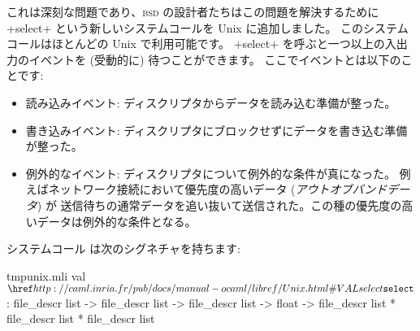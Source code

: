 これは深刻な問題であり、\textsc{bsd} の設計者たちはこの問題を解決するために
\ml+select+ という新しいシステムコールを Unix に追加しました。
このシステムコールはほとんどの Unix で利用可能です。
\ml+select+ を呼ぶと一つ以上の入出力のイベントを (受動的に) 待つことができます。
ここでイベントとは以下のことです:
%
\begin{itemize}
\item 読み込みイベント: ディスクリプタからデータを読み込む準備が整った。

\item 書き込みイベント: ディスクリプタにブロックせずにデータを書き込む準備が整った。

\item 例外的なイベント: ディスクリプタについて例外的な条件が真になった。
  例えばネットワーク接続において優先度の高いデータ (\emph{アウトオブバンドデータ}) が
  送信待ちの通常データを追い抜いて送信された。この種の優先度の高いデータは例外的な条件となる。
\end{itemize}
%
システムコール  は次のシグネチャを持ちます:
%
\begin{listingcodefile}{tmpunix.mli}
val $\libvalue{Unix}{select}$ :
    file_descr list -> file_descr list -> file_descr list ->
      float -> file_descr list * file_descr list * file_descr list
\end{listingcodefile}
%
